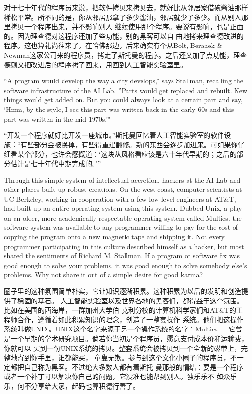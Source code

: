 \ifdefined\chs
对于七十年代的程序员来说，把软件拷贝来拷贝去，就好比从邻居家借碗酱油那样稀松平常。所不同的是，你从邻居那拿了多少酱油，邻居就少了多少。而从别人那里拷贝一个程序出来，并不影响别人
继续使用那个程序。要说有影响，也是正面的。因为理查德对这程序还加了些功能，别的黑客可以自
由地拷来理查德改进的程序。这也算礼尚往来了。在哈佛那边，后来确实有个从Bolt,
Beranek \& Newman这家公司来的程序员，拷走了斯托曼的程序。之后还又加了点功能，理查德则又把改进后的程序拷了回来，用回到人工智能实验室里。
\fi

\ifdefined\eng
``A program would develop the way a city develops," says Stallman, recalling the software infrastructure of the AI Lab. ''Parts would get replaced and rebuilt. New things would get added on. But you could always look at a certain part and say, `Hmm, by the style, I see this part was written back in the early 60s and this part was written in the mid-1970s.'\hspace{0.01in}"
\fi

\ifdefined\chs
``开发一个程序就好比开发一座城市。''斯托曼回忆着人工智能实验室的软件设施：``有些部分会被换掉，有些得重建翻修。新的东西会逐步加进来。可如果你仔细看某个部分，也许会感慨道：`这块从风格看应该是六十年代早期的；之后的部分估计是七十年代中期完成的。'\hspace{0.01in}''
\fi

\ifdefined\eng
Through this simple system of intellectual accretion, hackers at the AI Lab and other places built up robust creations. On the west coast, computer scientists at UC Berkeley, working in cooperation with a few low-level engineers at AT\&T, had built up an entire operating system using this system. Dubbed Unix, a play on an older, more academically respectable operating system called Multics, the software system was available to any programmer willing to pay for the cost of copying the program onto a new magnetic tape and shipping it. Not every programmer participating in this culture described himself as a hacker, but most shared the sentiments of Richard M. Stallman. If a program or software fix was good enough to solve your problems, it was good enough to solve somebody else's problems. Why not share it out of a simple desire for good karma?
\fi

\ifdefined\chs
圈子里的这种氛围简单朴实，它让知识逐渐积累。这种积累为以后的发明和创造提供了稳固的基石。
人工智能实验室以及世界各地的黑客们，都得益于这个氛围。比如在美国的西海岸，一群加州大学伯
克利分校的计算机科学家们和AT\&T的工程师合作，遵循着如此积累知识的理念，创造了一整套操作
系统。他们把这操作系统叫做UNIX。UNIX这个名字来源于另一个操作系统的名字：Multics
--- 它曾是一个早期的学术研究项目。倘若你当初是个程序员，愿意支付成本价和运输费，你就可以
买到一份UNIX系统的拷贝。整套系统会被拷贝到一个全新的磁带上，完整地寄到你手里，谁都能买，
童叟无欺。参与到这个文化小圈子的程序员，不一定都把自己称为黑客。不过绝大多数人都有着斯托
曼那般的情结：要是一个程序或者一个补丁可以解决你自己的问题，它没准也能帮到别人。独乐乐不
如众乐乐，何不分享给大家，起码也算积德行善了。
\fi

